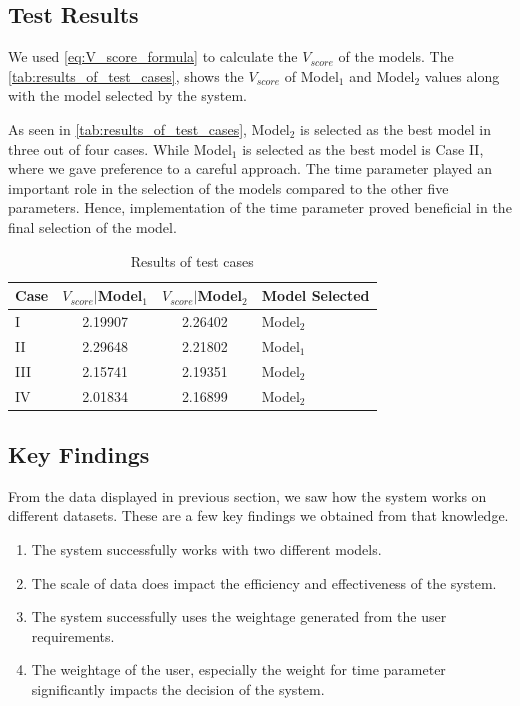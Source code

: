 \documentclass[a4paper,fleqn]{cas-dc}
\begin{document}
\subsection{Test Results}\label{subsec:results_and_discussion}
We used \autoref{eq:V_score_formula} to calculate the $V_{score}$ of the models. The \autoref{tab:results_of_test_cases}, shows the $V_{score}$ of Model$_1$ and Model$_2$ values along with the model selected by the system.

As seen in \autoref{tab:results_of_test_cases}, Model$_2$ is selected as the best model in three out of four cases. While Model$_1$ is selected as the best model is Case II, where we gave preference to a careful approach. The time parameter played an important role in the selection of the models compared to the other five parameters. Hence, implementation of the time parameter proved beneficial in the final selection of the model.

\begin{table}[ht]
    \caption{Results of test cases}\label{tab:results_of_test_cases}
    \begin{tabular*}{\tblwidth}{@{}LCCL@{}}
        \toprule
        Case & $V_{score}|$Model$_1$ & $V_{score}|$Model$_2$ & Model Selected \\
        \midrule
        I & 2.19907 & 2.26402 & Model$_2$ \\
        II & 2.29648 & 2.21802 & Model$_1$ \\
        III & 2.15741 & 2.19351 & Model$_2$ \\
        IV & 2.01834 & 2.16899 & Model$_2$ \\
        \bottomrule
    \end{tabular*}
\end{table}

\subsection{Key Findings}\label{subsec:key_findings}

From the data displayed in previous section, we saw how the system works on different datasets. These are a few key findings we obtained from that knowledge.
\begin{enumerate}
    \item The system successfully works with two different models.
    \item The scale of data does impact the efficiency and effectiveness of the system.
    \item The system successfully uses the weightage generated from the user requirements.
    \item The weightage of the user, especially the weight for time parameter significantly impacts the decision of the system.
\end{enumerate}
\end{document}
